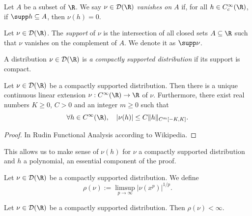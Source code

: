 \begin{definition}
  \label{def:distribution_vanishes}
  Let $A$ be a subset of $\R$. We say $\nu \in \mathcal{D}(\R)$ \emph{vanishes on} $A$
  if, for all $h \in C_c^\infty(\R)$, if $\supp h \subseteq A$, then $\nu(h)=0$.
\end{definition}

\begin{definition}
  \label{def:support_distribution}
  Let $\nu \in \mathcal{D}(\R)$.
  The \emph{support} of $\nu$ is the intersection of all closed sets $A \subseteq \R$
  such that $\nu$ vanishes on the complement of $A$. We denote it as $\supp \nu$.
\end{definition}

\begin{definition}
  \label{def:compactly_supported_distribution}
  A distribution $\nu \in \mathcal{D}(\R)$ is \emph{a compactly supported distribution}
  if its support is compact.
\end{definition}

\begin{lemma}
  \label{lem:extension_csd}
  Let $\nu \in \mathcal{D}(\R)$ be a compactly supported distribution.
  Then there is a unique continuous
  linear extension $\nu : C^\infty(\R) \rightarrow \R$ of $\nu$. Furthermore,
  there exist real numbers $K \geq 0$, $C>0$ and an integer $m \geq 0$
  such that
  \begin{equation*}
    \forall h \in C^\infty(\R), \quad |\nu(h)| \leq C \|h\|_{C^m[-K,K]}.
  \end{equation*}
\end{lemma}

\begin{proof}
  In Rudin Functional Analysis according to Wikipedia.
\end{proof}

This allows us to make sense of $\nu(h)$ for $\nu$ a compactly supported distribution
and $h$ a polynomial, an essential component of the proof.

\begin{definition}
  \label{def:radius_csd}
  Let $\nu \in \mathcal{D}(\R)$ be a compactly supported distribution.
  We define $$\rho(\nu) := \limsup_{p \to \infty} |\nu(x^p)|^{1/p} .$$
\end{definition}

\begin{lemma}
  \label{lem:radius_finite}
  Let $\nu \in \mathcal{D}(\R)$ be a compactly supported distribution.
  Then $\rho(\nu) < \infty$.
\end{lemma}

